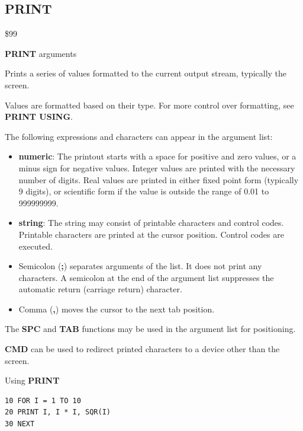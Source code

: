 \subsection{PRINT}
\begin{description}[leftmargin=2cm,style=nextline]
\item [Token:]    \$99

\item [Format:]   {\bf PRINT} arguments

\item [Usage:]    Prints a series of values formatted to the current output stream, typically the screen.

                  Values are formatted based on their type. For more control over formatting, see {\bf PRINT USING}.

                  The following expressions and characters can appear in the argument list:
                  \begin{itemize}
                     \item {\bf numeric}: The printout starts with a space for positive and zero values, or a minus sign for negative values. Integer values are printed with the necessary number of digits. Real values are printed in either fixed point form (typically 9 digits), or scientific form if the value is outside the range of 0.01 to 999999999.
                     \item {\bf string}: The string may consist of printable characters and control codes. Printable characters are printed at the cursor position. Control codes are executed.
                     \item Semicolon ({\bf ;}) separates arguments of the list. It does not print any characters. A semicolon at the end of the argument list suppresses the automatic return (carriage return) character.
                     \item Comma ({\bf ,}) moves the cursor to the next tab position.
                 \end{itemize}

\item [Remarks:]  The {\bf SPC} and {\bf TAB} functions may be used in the argument list for positioning.

                  {\bf CMD} can be used to redirect printed characters to a device other than the screen.

\item [Example:]  Using {\bf PRINT}

\begin{tcolorbox}[colback=black,coltext=white]
\verbatimfont{\codefont}
\begin{verbatim}
10 FOR I = 1 TO 10
20 PRINT I, I * I, SQR(I)
30 NEXT
\end{verbatim}
\end{tcolorbox}
\end{description}

